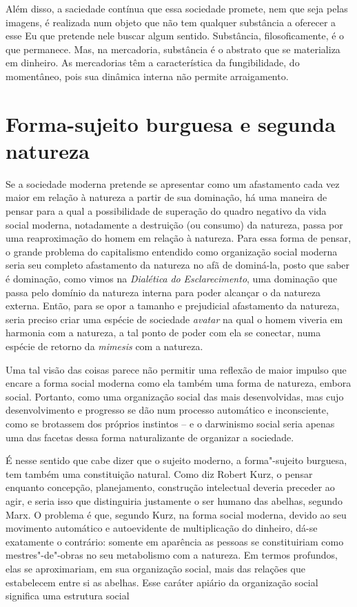 Além disso, a saciedade contínua que essa sociedade promete, nem que
seja pelas imagens, é realizada num objeto que não tem qualquer
substância a oferecer a esse Eu que pretende nele buscar algum sentido.
Substância, filosoficamente, é o que permanece. Mas, na mercadoria,
substância é o abstrato que se materializa em dinheiro. As mercadorias
têm a característica da fungibilidade, do momentâneo, pois sua dinâmica
interna não permite arraigamento.

\section{Forma-sujeito burguesa e segunda natureza}

Se a sociedade moderna pretende se apresentar como um afastamento cada
vez maior em relação à natureza a partir de sua dominação, há uma
maneira de pensar para a qual a possibilidade de superação do quadro
negativo da vida social moderna, notadamente a destruição (ou consumo)
da natureza, passa por uma reaproximação do homem em relação à natureza.
Para essa forma de pensar, o grande problema do capitalismo entendido
como organização social moderna seria seu completo afastamento da
natureza no afã de dominá-la, posto que saber é dominação, como vimos na
\emph{Dialética} \emph{do} \emph{Esclarecimento}, uma dominação que
passa pelo domínio da natureza interna para poder alcançar o da natureza
externa. Então, para se opor a tamanho e prejudicial afastamento da
natureza, seria preciso criar uma espécie de sociedade \emph{avatar} na
qual o homem viveria em harmonia com a natureza, a tal ponto de poder
com ela se conectar, numa espécie de retorno da \emph{mimesis} com a
natureza.

Uma tal visão das coisas parece não permitir uma reflexão de maior
impulso que encare a forma social moderna como ela também uma forma de
natureza, embora social. Portanto, como uma organização social das mais
desenvolvidas, mas cujo desenvolvimento e progresso se dão num processo
automático e inconsciente, como se brotassem dos próprios instintos -- e
o darwinismo social seria apenas uma das facetas dessa forma
naturalizante de organizar a sociedade.

É nesse sentido que cabe dizer que o sujeito moderno, a forma"-sujeito
burguesa, tem também uma constituição natural. Como diz Robert Kurz, o
pensar enquanto concepção, planejamento, construção intelectual deveria
preceder ao agir, e seria isso que distinguiria justamente o ser humano
das abelhas, segundo Marx. O problema é que, segundo Kurz, na forma
social moderna, devido ao seu movimento automático e autoevidente de
multiplicação do dinheiro, dá-se exatamente o contrário: somente em
aparência as pessoas se constituiriam como mestres"-de"-obras no seu
metabolismo com a natureza. Em termos profundos, elas se aproximariam,
em sua organização social, mais das relações que estabelecem entre si as
abelhas. Esse caráter apiário da organização social significa uma
estrutura social

